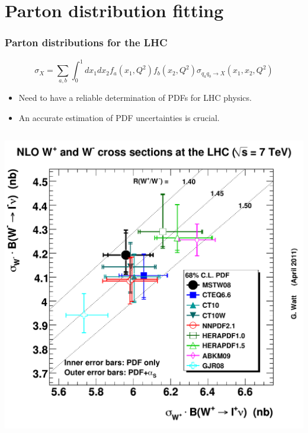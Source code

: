 \documentclass[10pt]{beamer}
\newcommand{\be}{\begin{equation*}}
\newcommand{\ee}{\end{equation*}}
\begin{document}
\section{Parton distribution fitting}
\begin{frame}
\frametitle{Parton distributions for the LHC}
\be \sigma_X= \sum_{a,b} \int_0^1 dx_1dx_2 f_a(x_1,Q^2)f_b(x_2,Q^2)\sigma_{q_aq_b \to X} \left( x_1,x_2,Q^2 \right) \ee
\begin{itemize}
		\item<1-> Need to have a reliable determination of PDFs for LHC physics.
		\item<1-> An accurate estimation of PDF uncertainties is crucial.
\end{itemize}

\begin{columns}
  \begin{column}{0.45\textwidth}
      \includegraphics[width=1.0\textwidth]{w+w-lhc7nlo68err.eps}
  \end{column}
  

\end{columns}
\end{frame}
\end{document}
